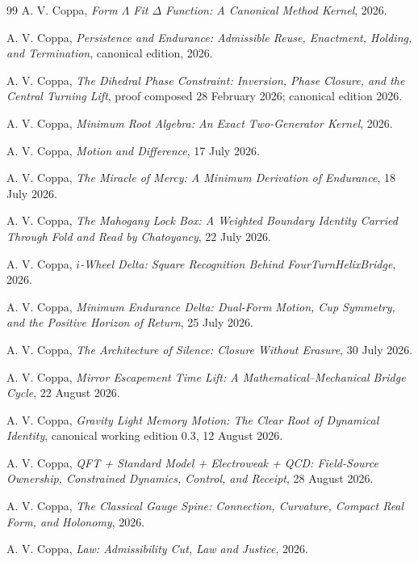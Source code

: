 \documentclass[11pt]{article}
\begin{document}
\begin{thebibliography}{99}
A. V. Coppa, \emph{Form $\Lambda$ Fit $\Delta$ Function: A Canonical Method Kernel}, 2026.

A. V. Coppa, \emph{Persistence and Endurance: Admissible Reuse, Enactment, Holding, and Termination}, canonical edition, 2026.

A. V. Coppa, \emph{The Dihedral Phase Constraint: Inversion, Phase Closure, and the Central Turning Lift}, proof composed 28 February 2026; canonical edition 2026.

A. V. Coppa, \emph{Minimum Root Algebra: An Exact Two-Generator Kernel}, 2026.

A. V. Coppa, \emph{Motion and Difference}, 17 July 2026.

A. V. Coppa, \emph{The Miracle of Mercy: A Minimum Derivation of Endurance}, 18 July 2026.

A. V. Coppa, \emph{The Mahogany Lock Box: A Weighted Boundary Identity Carried Through Fold and Read by Chatoyancy}, 22 July 2026.

A. V. Coppa, \emph{$i$-Wheel Delta: Square Recognition Behind FourTurnHelixBridge}, 2026.

A. V. Coppa, \emph{Minimum Endurance Delta: Dual-Form Motion, Cup Symmetry, and the Positive Horizon of Return}, 25 July 2026.

A. V. Coppa, \emph{The Architecture of Silence: Closure Without Erasure}, 30 July 2026.

A. V. Coppa, \emph{Mirror Escapement Time Lift: A Mathematical--Mechanical Bridge Cycle}, 22 August 2026.

A. V. Coppa, \emph{Gravity Light Memory Motion: The Clear Root of Dynamical Identity}, canonical working edition 0.3, 12 August 2026.

A. V. Coppa, \emph{QFT + Standard Model + Electroweak + QCD: Field-Source Ownership, Constrained Dynamics, Control, and Receipt}, 28 August 2026.

A. V. Coppa, \emph{The Classical Gauge Spine: Connection, Curvature, Compact Real Form, and Holonomy}, 2026.

A. V. Coppa, \emph{Law: Admissibility Cut, Law and Justice}, 2026.


\end{thebibliography}
\end{document}

